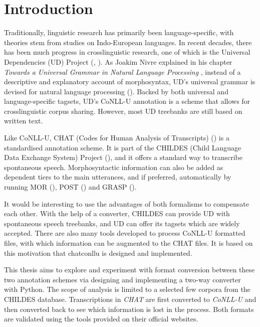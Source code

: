 \chapter{Introduction} %

\label{Chapter1} %

Traditionally, linguistic research has primarily been language-specific, with theories stem from studies on Indo-European languages. In recent decades, there has been much progress in crosslinguistic research, one of which is the Universal Dependencies (UD) Project (\cite{nivre2016}, \cite{nivre2020}). As Joakim Nivre explained in his chapter \emph{Towards a Universal Grammar in Natural Language Processing} , instead of a descriptive and explanatory account of morphosyntax, UD's universal grammar is devised for natural language processing (\cite{nivre2015}). Backed by both universal and language-specific tagsets, UD's CoNLL-U annotation is a scheme that allows for crosslinguistic corpus sharing. However, most UD treebanks are still based on written text.

Like CoNLL-U, CHAT (Codes for Human Analysis of Transcripts) (\cite{Macwhinney2000}) is a standardised annotation scheme. It is part of the CHILDES (Child Language Data Exchange System) Project (\cite{Macwhinney2000}), and it offers a standard way to transcribe spontaneous speech. Morphosyntactic information can also be added as dependent tiers to the main utterances, and if preferred, automatically by running MOR (\cite{Macwhinney2000}), POST (\cite{parisse2000}) and GRASP (\cite{Sagae2004}).

It would be interesting to use the advantages of both formalisms to compensate each other. With the help of a converter, CHILDES can provide UD with spontaneous speech treebanks, and UD can offer its tagsets which are widely accepted. There are also many tools developed to process CoNLL-U formatted files, with which information can be augmented to the CHAT files. It is based on this motivation that chatconllu is designed and implemented.

This thesis aims to explore and experiment with format conversion between these two annotation schemes via designing and implementing a two-way converter with Python. The scope of analysis is limited to a selected few corpora from the CHILDES database. Transcriptions in \emph{CHAT} are first converted to \emph{CoNLL-U} and then converted back to see which information is lost in the process. Both formats are validated using the tools provided on their official websites.

